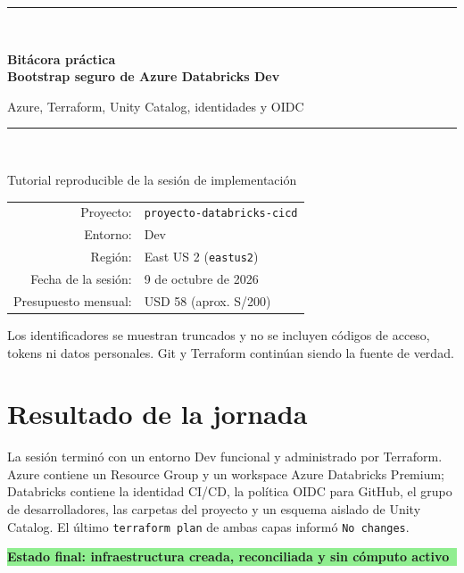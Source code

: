 \documentclass[11pt,a4paper]{article}
\newcommand{\resultado}[1]{\colorbox{lightgreen}{\strut\textbf{#1}}}
\begin{document}
\hypersetup{pageanchor=false}

\begin{titlepage}
  \centering
  \vspace*{1.8cm}
  {\color{dbblue}\rule{\textwidth}{1.2pt}}\\[0.9cm]
  {\Huge\bfseries Bitácora práctica\\[0.25cm]
  Bootstrap seguro de Azure Databricks Dev\par}
  \vspace{0.65cm}
  {\Large Azure, Terraform, Unity Catalog, identidades y OIDC\par}
  \vspace{0.9cm}
  {\color{dbblue}\rule{\textwidth}{1.2pt}}\\[1.3cm]
  {\large Tutorial reproducible de la sesión de implementación\par}
  \vfill
  \begin{tabular}{rl}
    Proyecto: & \texttt{proyecto-databricks-cicd} \\
    Entorno: & Dev \\
    Región: & East US 2 (\texttt{eastus2}) \\
    Fecha de la sesión: & 9 de octubre de 2026 \\
    Presupuesto mensual: & USD 58 (aprox. S/200) \\
  \end{tabular}
  \vfill
  {\small Los identificadores se muestran truncados y no se incluyen códigos de acceso, tokens ni
  datos personales. Git y Terraform continúan siendo la fuente de verdad.}
\end{titlepage}

\hypersetup{pageanchor=true}
\begingroup
  \small
  \setlength{\parskip}{0pt}
  \tableofcontents
\endgroup
\newpage
{}

\section{Resultado de la jornada}

La sesión terminó con un entorno Dev funcional y administrado por Terraform. Azure contiene un
Resource Group y un workspace Azure Databricks Premium; Databricks contiene la identidad CI/CD,
la política OIDC para GitHub, el grupo de desarrolladores, las carpetas del proyecto y un esquema
aislado de Unity Catalog. El último \texttt{terraform plan} de ambas capas informó
\texttt{No changes}.

\begin{center}
  \resultado{Estado final: infraestructura creada, reconciliada y sin cómputo activo}
\end{center}
\end{document}
